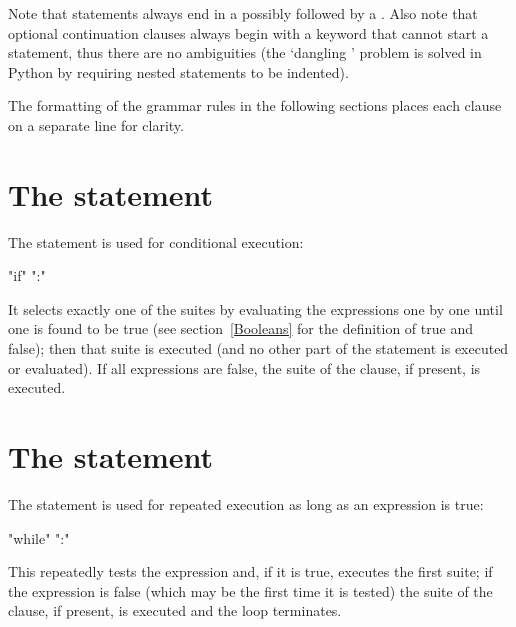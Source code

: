 Note that statements always end in a
 possibly followed by a
. Also note that optional
continuation clauses always begin with a keyword that cannot start a
statement, thus there are no ambiguities (the `dangling
' problem is solved in Python by requiring nested
 statements to be indented).

The formatting of the grammar rules in the following sections places
each clause on a separate line for clarity.


\section{The  statement\label{if}}

The  statement is used for conditional execution:

\begin{productionlist}
             {"if"  ":" }
\end{productionlist}

It selects exactly one of the suites by evaluating the expressions one
by one until one is found to be true (see section~\ref{Booleans} for
the definition of true and false); then that suite is executed (and no
other part of the  statement is executed or evaluated).  If
all expressions are false, the suite of the  clause, if
present, is executed.


\section{The  statement\label{while}}

The  statement is used for repeated execution as long
as an expression is true:

\begin{productionlist}
             {"while"  ":" }
\end{productionlist}

This repeatedly tests the expression and, if it is true, executes the
first suite; if the expression is false (which may be the first time it
is tested) the suite of the  clause, if present, is
executed and the loop terminates.

